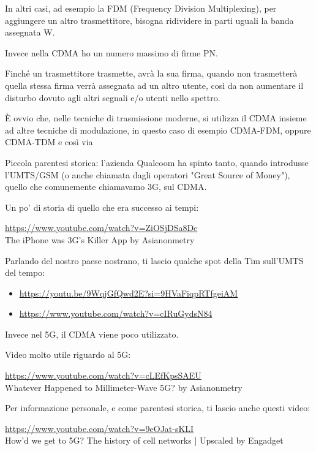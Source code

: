 \newpage 

\begin{tcolorbox}
    In altri casi, ad esempio la FDM (Frequency Division Multiplexing), 
    per aggiungere un altro trasmettitore, bisogna ridividere in parti uguali la banda assegnata W. \newline 

    Invece nella CDMA ho un numero massimo di firme PN. \newline 

    Finché un trasmettitore trasmette, avrà la sua firma, 
    quando non trasmetterà quella stessa firma verrà assegnata ad un altro utente, 
    così da non aumentare il disturbo dovuto agli altri segnali e/o utenti nello spettro. \newline 

    È ovvio che, nelle tecniche di trasmissione moderne, si utilizza il CDMA insieme ad altre tecniche di modulazione, 
    in questo caso di esempio CDMA-FDM, oppure CDMA-TDM e così via

    Piccola parentesi storica: 
    l'azienda Qualcoom ha spinto tanto, 
    quando introdusse l'UMTS/GSM (o anche chiamata dagli operatori "Great Source of Money"), 
    quello che comunemente chiamavamo 3G, 
    sul CDMA. \newline 

    Un po' di storia di quello che era successo ai tempi: \newline 

    \url{https://www.youtube.com/watch?v=ZiOSjDSa8Dc} \\ The iPhone was 3G's Killer App by Asianonmetry \newline 

    Parlando del nostro paese nostrano, ti lascio qualche spot della Tim sull'UMTS del tempo: 

    \begin{itemize}
        \item \url{https://youtu.be/9WqjGfQwd2E?si=9HVaFiqpRTfgeiAM} 
        \item \url{https://www.youtube.com/watch?v=cIRuGydsN84}
    \end{itemize}

    Invece nel 5G, il CDMA viene poco utilizzato. \newline 

    Video molto utile riguardo al 5G: \newline 

    \url{https://www.youtube.com/watch?v=cLEfKpsSAEU}\\ Whatever Happened to Millimeter-Wave 5G? by Asianonmetry \newline 

    Per informazione personale, e come parentesi storica, ti lascio anche questi video: \newline 

    \url{https://www.youtube.com/watch?v=9eOJat-sKLI} \\ How'd we get to 5G? The history of cell networks | Upscaled by Engadget
\end{tcolorbox}

